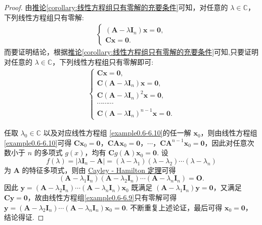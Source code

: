 \documentclass[../../main.tex]{subfiles}%
\begin{document}
\begin{proof}

由\hyperref[corollary:线性方程组只有零解的充要条件]{推论\ref{corollary:线性方程组只有零解的充要条件}}可知，对任意的 $\lambda\in\mathbb{C}$，下列线性方程组只有零解:
\begin{align}
\begin{cases}
(\boldsymbol{A}-\lambda\boldsymbol{I}_n)\boldsymbol{x}=\boldsymbol{0}, \\
\boldsymbol{C}\boldsymbol{x}=\boldsymbol{0}.
\end{cases} \label{example0.6-6.9}
\end{align}
而要证明结论，根据\hyperref[corollary:线性方程组只有零解的充要条件]{推论\ref{corollary:线性方程组只有零解的充要条件}}可知,只要证明对任意的 $\lambda\in\mathbb{C}$，下列线性方程组只有零解即可:
\begin{align}
\begin{cases}
\boldsymbol{C}\boldsymbol{x}=\boldsymbol{0}, \\
\boldsymbol{C}(\boldsymbol{A}-\lambda\boldsymbol{I}_n)\boldsymbol{x}=\boldsymbol{0}, \\
\boldsymbol{C}(\boldsymbol{A}-\lambda\boldsymbol{I}_n)^2\boldsymbol{x}=\boldsymbol{0}, \\
\cdots\cdots\cdots \\
\boldsymbol{C}(\boldsymbol{A}-\lambda\boldsymbol{I}_n)^{n - 1}\boldsymbol{x}=\boldsymbol{0}.
\end{cases} \label{example0.6-6.10}
\end{align}

任取 $\lambda_0\in\mathbb{C}$ 以及对应线性方程组 \eqref{example0.6-6.10}的任一解 $\boldsymbol{x}_0$，则由线性方程组 \eqref{example0.6-6.10}可得 $\boldsymbol{C}\boldsymbol{x}_0=\boldsymbol{0}$，$\boldsymbol{C}\boldsymbol{A}\boldsymbol{x}_0=\boldsymbol{0}$，$\cdots$，$\boldsymbol{C}\boldsymbol{A}^{n - 1}\boldsymbol{x}_0=\boldsymbol{0}$，因此对任意次数小于 $n$ 的多项式 $g(x)$，均有 $\boldsymbol{C}g(\boldsymbol{A})\boldsymbol{x}_0=\boldsymbol{0}$. 设
\[f(\lambda)=|\lambda\boldsymbol{I}_n - \boldsymbol{A}|=(\lambda - \lambda_1)(\lambda - \lambda_2)\cdots(\lambda - \lambda_n)\]
为 $\boldsymbol{A}$ 的特征多项式，则由 \hyperref[theorem:Cayley-Hamilton定理]{Cayley - Hamilton 定理}可得
\[(\boldsymbol{A}-\lambda_1\boldsymbol{I}_n)(\boldsymbol{A}-\lambda_2\boldsymbol{I}_n)\cdots(\boldsymbol{A}-\lambda_n\boldsymbol{I}_n)=\boldsymbol{O}.\]
因此 $\boldsymbol{y}=(\boldsymbol{A}-\lambda_2\boldsymbol{I}_n)\cdots(\boldsymbol{A}-\lambda_n\boldsymbol{I}_n)\boldsymbol{x}_0$ 既满足 $(\boldsymbol{A}-\lambda_1\boldsymbol{I}_n)\boldsymbol{y}=\boldsymbol{0}$，又满足 $\boldsymbol{C}\boldsymbol{y}=\boldsymbol{0}$，故由线性方程组\eqref{example0.6-6.9}只有零解可得 $\boldsymbol{y}=(\boldsymbol{A}-\lambda_2\boldsymbol{I}_n)\cdots(\boldsymbol{A}-\lambda_n\boldsymbol{I}_n)\boldsymbol{x}_0=\boldsymbol{0}$. 不断重复上述论证，最后可得 $\boldsymbol{x}_0=\boldsymbol{0}$，结论得证. 

\end{proof}
\end{document}
